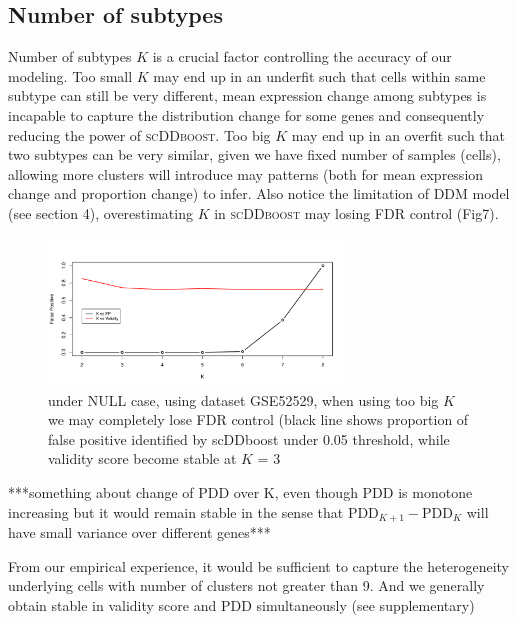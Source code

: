 \documentclass[aoas,preprint]{imsart}
\begin{document}
\subsection{Number of subtypes}
Number of subtypes $K$ is a crucial factor controlling the accuracy of our modeling. 
Too small $K$ may end up in an underfit such that cells within same subtype can still be very different,
mean expression change among subtypes is incapable to capture the distribution change for some genes and consequently reducing the power of \textsc{scDDboost}.
Too big $K$ may end up in an overfit such that two subtypes can be very similar, given we have fixed number of samples (cells), allowing more clusters will introduce may patterns (both for mean expression change and proportion change) to infer. Also notice the limitation of DDM model (see section 4), overestimating $K$ in \textsc{scDDboost} may losing FDR control (Fig7).

\begin{figure}[H]
\includegraphics[width = 0.7\textwidth]{Figs/NULL.pdf}
 \caption{under NULL case, using dataset GSE52529, when using too big $K$ we may completely lose FDR control (black line shows proportion of false positive identified by scDDboost under 0.05 threshold, while validity score become stable at $K$ = 3 }
  \label{fig:7}
\end{figure}

***something about change of PDD over K, even though PDD is monotone increasing but it would remain stable in the sense that $\text{PDD}_{K+1} - \text{PDD}_K$ will have small variance over different genes***

From our empirical experience, it would be sufficient to capture the heterogeneity underlying cells with number of clusters not greater than 9.  And we generally obtain stable in validity score and PDD simultaneously (see supplementary)
\end{document}
